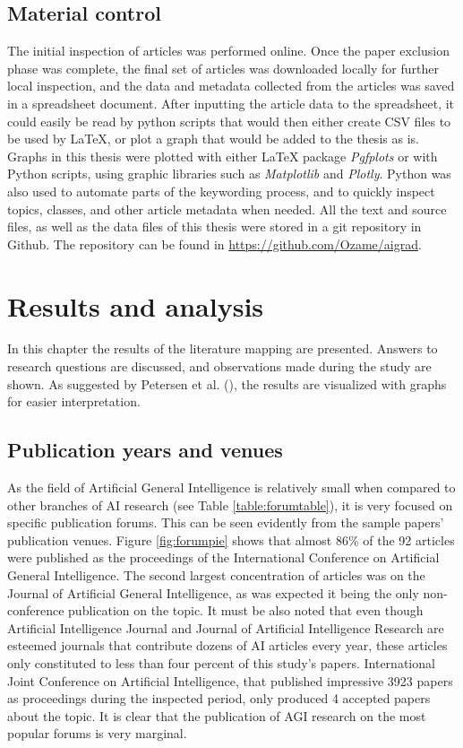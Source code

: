 \section{Material control}

The initial inspection of articles was performed online. Once the paper
exclusion phase was complete, the final set of articles was downloaded locally
for further local inspection, and the data and metadata collected from the
articles was saved in a spreadsheet document. After inputting the article data
to the spreadsheet, it could easily be read by python scripts that would then
either create CSV files to be used by LaTeX, or plot a graph that would be added
to the thesis as is. Graphs in this thesis were plotted with either LaTeX
package \emph{Pgfplots} or with Python scripts, using graphic libraries such as
\emph{Matplotlib} and \emph{Plotly}. Python was also used to automate parts of
the keywording process, and to quickly inspect topics, classes, and other
article metadata when needed. All the text and source files, as well as the data
files of this thesis were stored in a git repository in Github. The repository
can be found in \url{https://github.com/Ozame/aigrad}.


\chapter{Results and analysis}
\label{chap:results}

 In this chapter the results of the literature mapping are presented. Answers to
 research questions are discussed, and observations made during the study are
 shown. As suggested by Petersen et al. (\cite*{petersen2008}), the results are
 visualized with graphs for easier interpretation.  

 \section{Publication years and venues}

 As the field of Artificial General Intelligence is relatively small when
 compared to other branches of AI research (see Table \ref{table:forumtable}),
 it is very focused on specific publication forums. This can be seen evidently
 from the sample papers' publication venues. Figure \ref*{fig:forumpie} shows
 that almost 86\% of the 92 articles were published as the proceedings of the
 International Conference on Artificial General Intelligence. The second largest
 concentration of articles was on the Journal of Artificial General
 Intelligence, as was expected it being the only non-conference publication on
 the topic. It must be also noted that even though Artificial Intelligence
 Journal and Journal of Artificial Intelligence Research are esteemed journals
 that contribute dozens of AI articles every year, these articles only
 constituted to less than four percent of this study's papers. International
 Joint Conference on Artificial Intelligence, that published impressive 3923
 papers as proceedings during the inspected period, only produced 4 accepted
 papers about the topic. It is clear that the publication of AGI research on the
 most popular forums is very marginal.



